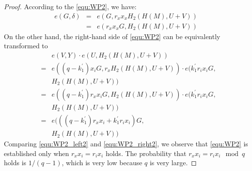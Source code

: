 \documentclass[letterpaper,12pt]{article}
\begin{document}
\begin{proof}
According to the  \eqref{equ:WP2}, we have:
%
\begin{eqnarray}\label{equ:WP2_left2}
e(G,\delta)&=&e(G, r_xx_xH_2(H(M), U+V)) \nonumber\\
&=&e(r_xx_x G, H_2(H(M), U+V))
\end{eqnarray}
%
On the other hand, the right-hand side of \eqref{equ:WP2} can be equivalently transformed to
\begin{eqnarray} \label{equ:WP2_right2}
&&e(V, Y)\cdot e(U, H_2(H(M), U+V)) \nonumber\\
&=&e((q-k_1^\prime)x_i G, r_xH_2(H(M), U+V))\cdot e(k_1^\prime r_ix_i G, \nonumber\\
&&H_2(H(M),U+V)) \nonumber\\
&=&e((q-k_1^\prime)r_xx_i G, H_2(H(M), U+V))\cdot e(k_1^\prime r_ix_i G, \nonumber\\
&&H_2(H(M), U+V))\nonumber\\
&=&e(((q-k_1^\prime)r_xx_i+k_1^\prime r_ix_i) G, \nonumber\\
&&H_2(H(M), U+V))
\end{eqnarray}
%
Comparing  \eqref{equ:WP2_left2} and \eqref{equ:WP2_right2}, we observe that \eqref{equ:WP2} is established only when $r_xx_i=r_ix_i$ holds.
The probability that $r_xx_i=r_ix_i \mod q$ holds is $1/(q-1)$, which is very low because $q$ is very large.


\end{proof}
\end{document}
